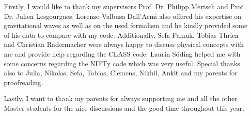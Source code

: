 Firstly, I would like to thank my supervisors Prof. Dr. Philipp Mertsch and Prof. Dr. Julien Lesgourgues. Lorenzo Valbusa Dall'Armi also offered his expertise on gravitational waves as well as on the used formalism and he kindly provided some of his data to compare with my code. Additionally, Sefa Pamuk, Tobias Thrien and Christian Radermacher were always happy to discuss physical concepts with me and provide help regarding the CLASS code. Laurin Söding helped me with some concerns regarding the NIFTy code which was very useful. Special thanks also to Julia, Nikolas, Sefa, Tobias, Clemens, Nikhil, Ankit and my parents for proofreading. 

Lastly, I want to thank my parents for always supporting me and all the other Master students for the nice discussions and the good time throughout this year.